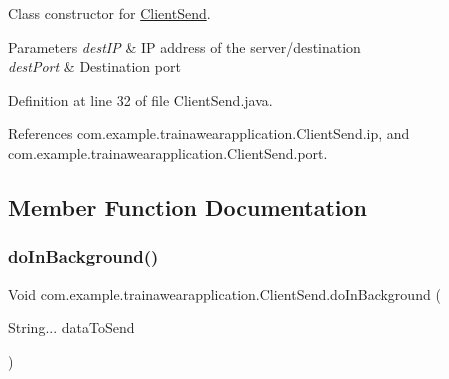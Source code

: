 Class constructor for \mbox{\hyperlink{classcom_1_1example_1_1trainawearapplication_1_1_client_send}{Client\+Send}}. 


\begin{DoxyParams}{Parameters}
{\em dest\+IP} & IP address of the server/destination \\
\hline
{\em dest\+Port} & Destination port \\
\hline
\end{DoxyParams}


Definition at line 32 of file Client\+Send.\+java.


\begin{DoxyCode}{0}

\end{DoxyCode}


References com.\+example.\+trainawearapplication.\+Client\+Send.\+ip, and com.\+example.\+trainawearapplication.\+Client\+Send.\+port.



\subsection{Member Function Documentation}
\mbox{\label{classcom_1_1example_1_1trainawearapplication_1_1_client_send_ad8e0bcd2078b23e83c1060065834ae7d}} 
\subsubsection{\texorpdfstring{doInBackground()}{doInBackground()}}
{\footnotesize\ttfamily Void com.\+example.\+trainawearapplication.\+Client\+Send.\+do\+In\+Background (\begin{DoxyParamCaption}\item[{String...}]{data\+To\+Send }\end{DoxyParamCaption})\hspace{0.3cm}{\ttfamily [inline]}}



